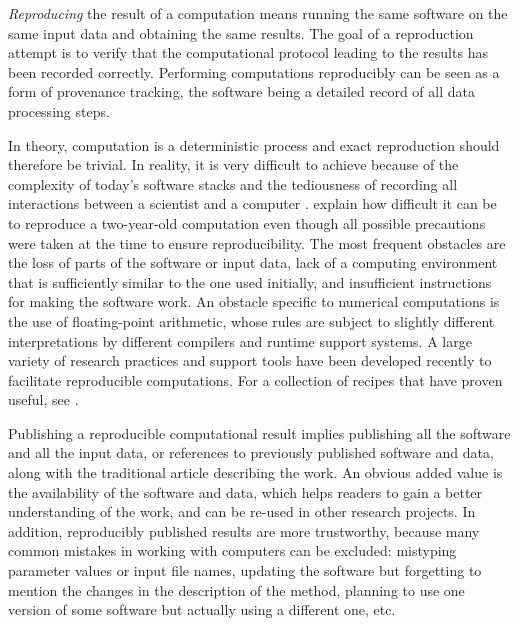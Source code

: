 \documentclass[11pt]{article}
\begin{document}
\textit{Reproducing} the result of a computation means running the
same software on the same input data and obtaining the same results.
The goal of a reproduction attempt is to verify that the computational
protocol leading to the results has been recorded correctly.
Performing computations reproducibly can be seen as a form of
provenance tracking, the software being a detailed record of all data
processing steps.

In theory, computation is a deterministic process and exact
reproduction should therefore be trivial. In reality, it is very
difficult to achieve because of the complexity of today's software
stacks and the tediousness of recording all interactions between a
scientist and a computer 
\citep[although a number of recent tools have attempted to automate such recording, e.g.][]{guo:2011, davison:2012, murta:2015}.
\citeauthor{Mesnard:2016} explain
\citep{Mesnard:2016} how difficult it can be to reproduce a two-year-old
computation even though all possible precautions were taken at the
time to ensure reproducibility.  The most frequent obstacles are the
loss of parts of the software or input data, lack of a computing
environment that is sufficiently similar to the one used initially,
and insufficient instructions for making the software work. An
obstacle specific to numerical computations is the use of
floating-point arithmetic, whose rules are subject to slightly
different interpretations by different compilers and runtime support
systems. A large variety of research practices and support tools have
been developed recently to facilitate reproducible computations. For a
collection of recipes that have proven useful, see
\citet{kitzes:2017}.

Publishing a reproducible computational result implies publishing all
the software and all the input data, or references to previously
published software and data, along with the traditional article
describing the work. An obvious added value is the availability of the
software and data, which helps readers to gain a better understanding
of the work, and can be re-used in other research projects. In
addition, reproducibly published results are more trustworthy, because
many common mistakes in working with computers can be excluded:
mistyping parameter values or input file names, updating the software
but forgetting to mention the changes in the description of the
method, planning to use one version of some software but actually
using a different one, etc.
\end{document}
